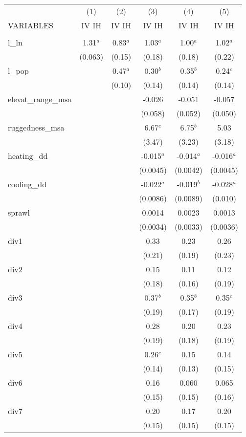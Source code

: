\documentclass[]{article}
\begin{document}
\begin{tabular}{lccccc} \hline
 & (1) & (2) & (3) & (4) & (5) \\
VARIABLES & IV IH & IV IH & IV IH & IV IH & IV IH \\ \hline
 &  &  &  &  &  \\
l\_ln & 1.31$^a$ & 0.83$^a$ & 1.03$^a$ & 1.00$^a$ & 1.02$^a$ \\
 & (0.063) & (0.15) & (0.18) & (0.18) & (0.22) \\
l\_pop &  & 0.47$^a$ & 0.30$^b$ & 0.35$^b$ & 0.24$^c$ \\
 &  & (0.10) & (0.14) & (0.14) & (0.14) \\
elevat\_range\_msa &  &  & -0.026 & -0.051 & -0.057 \\
 &  &  & (0.058) & (0.052) & (0.050) \\
ruggedness\_msa &  &  & 6.67$^c$ & 6.75$^b$ & 5.03 \\
 &  &  & (3.47) & (3.23) & (3.18) \\
heating\_dd &  &  & -0.015$^a$ & -0.014$^a$ & -0.016$^a$ \\
 &  &  & (0.0045) & (0.0042) & (0.0045) \\
cooling\_dd &  &  & -0.022$^a$ & -0.019$^b$ & -0.028$^a$ \\
 &  &  & (0.0086) & (0.0089) & (0.010) \\
sprawl &  &  & 0.0014 & 0.0023 & 0.0013 \\
 &  &  & (0.0034) & (0.0033) & (0.0036) \\
div1 &  &  & 0.33 & 0.23 & 0.26 \\
 &  &  & (0.21) & (0.19) & (0.23) \\
div2 &  &  & 0.15 & 0.11 & 0.12 \\
 &  &  & (0.18) & (0.16) & (0.19) \\
div3 &  &  & 0.37$^b$ & 0.35$^b$ & 0.35$^c$ \\
 &  &  & (0.19) & (0.17) & (0.19) \\
div4 &  &  & 0.28 & 0.20 & 0.23 \\
 &  &  & (0.19) & (0.18) & (0.19) \\
div5 &  &  & 0.26$^c$ & 0.15 & 0.14 \\
 &  &  & (0.14) & (0.13) & (0.15) \\
div6 &  &  & 0.16 & 0.060 & 0.065 \\
 &  &  & (0.15) & (0.15) & (0.16) \\
div7 &  &  & 0.20 & 0.17 & 0.20 \\
 &  &  & (0.15) & (0.15) & (0.15) \\

\end{tabular}
\end{document}
